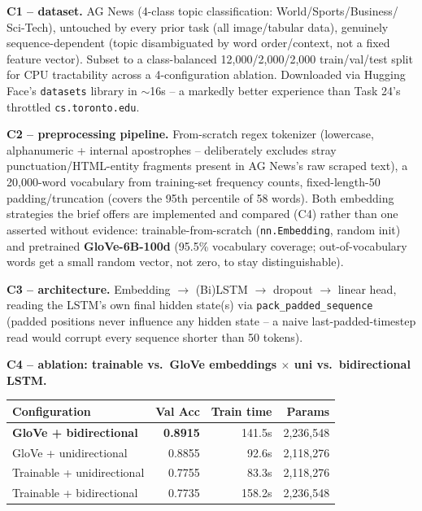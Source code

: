 \documentclass[11pt,a4paper]{article}
\begin{document}
\textbf{C1 -- dataset.} AG News (4-class topic classification: World/Sports/Business/
Sci-Tech), untouched by every prior task (all image/tabular data), genuinely
sequence-dependent (topic disambiguated by word order/context, not a fixed feature vector).
Subset to a class-balanced 12{,}000/2{,}000/2{,}000 train/val/test split for CPU tractability
across a 4-configuration ablation. Downloaded via Hugging Face's \texttt{datasets} library in
$\sim$16s -- a markedly better experience than Task 24's throttled \texttt{cs.toronto.edu}.

\textbf{C2 -- preprocessing pipeline.} From-scratch regex tokenizer (lowercase,
alphanumeric + internal apostrophes -- deliberately excludes stray punctuation/HTML-entity
fragments present in AG News's raw scraped text), a 20{,}000-word vocabulary from
training-set frequency counts, fixed-length-50 padding/truncation (covers the 95th
percentile of 58 words). Both embedding strategies the brief offers are implemented and
compared (C4) rather than one asserted without evidence: trainable-from-scratch
(\texttt{nn.Embedding}, random init) and pretrained \textbf{GloVe-6B-100d} (95.5\% vocabulary
coverage; out-of-vocabulary words get a small random vector, not zero, to stay
distinguishable).

\textbf{C3 -- architecture.} Embedding $\to$ (Bi)LSTM $\to$ dropout $\to$ linear head, reading
the LSTM's own final hidden state(s) via \texttt{pack\_padded\_sequence} (padded positions
never influence any hidden state -- a naive last-padded-timestep read would corrupt every
sequence shorter than 50 tokens).

\textbf{C4 -- ablation: trainable vs.\ GloVe embeddings $\times$ uni vs.\ bidirectional LSTM.}

\begin{table}[H]
\centering
\begin{tabular}{lrrr}
\toprule
\textbf{Configuration} & \textbf{Val Acc} & \textbf{Train time} & \textbf{Params} \\
\midrule
\textbf{GloVe + bidirectional} & \textbf{0.8915} & 141.5s & 2{,}236{,}548 \\
GloVe + unidirectional & 0.8855 & 92.6s & 2{,}118{,}276 \\
Trainable + unidirectional & 0.7755 & 83.3s & 2{,}118{,}276 \\
Trainable + bidirectional & 0.7735 & 158.2s & 2{,}236{,}548 \\
\bottomrule
\end{tabular}
\end{table}
\end{document}
